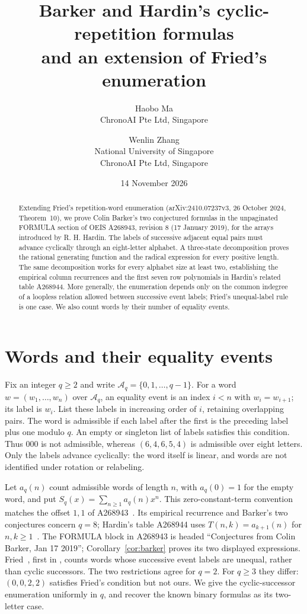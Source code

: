 \documentclass[11pt]{article}
\title{Barker and Hardin's cyclic-repetition formulas\\and an extension of Fried's enumeration}
\author{Haobo Ma\\\small ChronoAI Pte Ltd, Singapore
\and Wenlin Zhang\\\small National University of Singapore\\\small ChronoAI Pte Ltd, Singapore}
\date{14 November 2026}
\newcommand{\aq}{a_q}
\begin{document}
\maketitle
\begin{abstract}
Extending Fried's repetition-word enumeration (arXiv:2410.07237v3,
26 October 2024, Theorem~10), we prove
Colin Barker's two conjectured formulas in the unpaginated FORMULA
section of OEIS A268943, revision 8 (17 January 2019), for the arrays introduced
by R. H. Hardin. The labels of successive adjacent equal pairs must advance
cyclically through an eight-letter alphabet. A three-state decomposition proves
the rational generating function and the radical expression for every positive
length. The same decomposition works for every alphabet size at least two,
establishing the empirical column recurrences and the first seven row
polynomials in Hardin's related table A268944. More generally, the enumeration
depends only on the common indegree of a loopless relation allowed between
successive event labels; Fried's unequal-label rule is one case. We also
count words by their number of equality events.
\end{abstract}

\section{Words and their equality events}
Fix an integer $q\geq2$ and write $\mathcal A_q=\{0,1,\ldots,q-1\}$.
For a word $w=(w_1,\ldots,w_n)$ over $\mathcal A_q$, an equality event is an
index $i<n$ with $w_i=w_{i+1}$; its label is $w_i$. List these labels in
increasing order of $i$, retaining overlapping pairs. The word is admissible
if each label after the first is the preceding label plus one modulo $q$.
An empty or singleton list of labels satisfies this condition. Thus $000$
is not admissible, whereas $(6,4,6,5,4)$ is admissible over eight letters.
Only the labels advance cyclically: the word itself is linear, and words
are not identified under rotation or relabeling.

Let $\aq(n)$ count admissible words of length $n$, with $\aq(0)=1$ for the
empty word, and put $S_q(x)=\sum_{n\geq1}\aq(n)x^n$. This zero-constant-term
convention matches the offset $1,1$ of A268943~\cite{hardin8}.
Its empirical recurrence and Barker's two conjectures concern $q=8$;
Hardin's table A268944 uses $T(n,k)=a_{k+1}(n)$ for $n,k\geq1$~\cite{hardintable}.
The FORMULA block in A268943 is headed ``Conjectures from Colin Barker,
Jan 17 2019''; Corollary~\ref{cor:barker} proves its two displayed expressions.
Fried~\cite[Section 3.2, Theorem 4]{fried}, first in
\cite[Section 2.8, Theorem 10]{friedpre}, counts words whose successive
event labels are unequal, rather than cyclic successors. The two restrictions
agree for $q=2$. For $q\geq3$ they differ: $(0,0,2,2)$ satisfies Fried's
condition but not ours. We give the cyclic-successor enumeration uniformly
in $q$, and recover the known binary formulas as its two-letter case.
\end{document}
